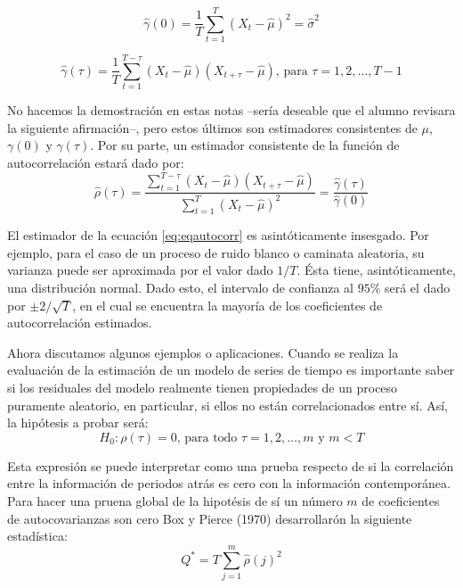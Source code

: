 \documentclass[
]{book}
\begin{document}
\begin{equation}
    \hat{\gamma}(0) = \frac{1}{T} \sum^T_{t=1} (X_t - \hat{\mu})^2 = \hat{\sigma}^2
    \label{eq:em7}
\end{equation}

\begin{equation}
    \hat{\gamma}(\tau) = \frac{1}{T} \sum^{T - \tau}_{t=1} (X_t - \hat{\mu})(X_{t+\tau} - \hat{\mu}) \mbox{, para } \tau = 1, 2, \ldots, T-1
    \label{eq:em8}
\end{equation}

No hacemos la demostración en estas notas --sería deseable que el alumno revisara la siguiente afirmación--, pero estos últimos son estimadores consistentes de \(\mu\), \(\gamma(0)\) y \(\gamma(\tau)\). Por su parte, un estimador consistente de la función de autocorrelación estará dado por:
\begin{equation}
  \hat{\rho}(\tau) = \frac{\sum^{T - \tau}_{t=1} (X_t - \hat{\mu})(X_{t+\tau} - \hat{\mu})}{\sum^T_{t=1} (X_t - \hat{\mu})^2} = \frac{\hat{\gamma}(\tau)}{\hat{\gamma}(0)}
  \label{eq:eqautocorr}
\end{equation}

El estimador de la ecuación \eqref{eq:eqautocorr} es asintóticamente insesgado. Por ejemplo, para el caso de un proceso de ruido blanco o caminata aleatoria, su varianza puede ser aproximada por el valor dado \(1/T\). Ésta tiene, asintóticamente, una distribución normal. Dado esto, el intervalo de confianza al \(95\%\) será el dado por \(\pm 2/\sqrt{T}\), en el cual se encuentra la mayoría de los coeficientes de autocorrelación estimados.

Ahora discutamos algunos ejemplos o aplicaciones. Cuando se realiza la evaluación de la estimación de un modelo de series de tiempo es importante saber si los residuales del modelo realmente tienen propiedades de un proceso puramente aleatorio, en particular, si ellos no están correlacionados entre sí. Así, la hipótesis a probar será:
\begin{equation}
    H_0 : \rho(\tau) = 0 \mbox{, para todo } \tau = 1, 2, \ldots, m \mbox{ y } m < T
    \label{eq:eqautocorr1}
\end{equation}

Esta expresión se puede interpretar como una prueba respecto de si la correlación entre la información de periodos atrás es cero con la información contemporánea. Para hacer una pruena global de la hipotésis de sí un número \(m\) de coeficientes de autocovarianzas son cero Box y Pierce (1970) desarrollarón la siguiente estadística:
\begin{equation}
    Q^* = T \sum_{j = 1}^{m} \hat{\rho} (j)^2
    \label{eq:eqautocorr2}
\end{equation}
\end{document}
